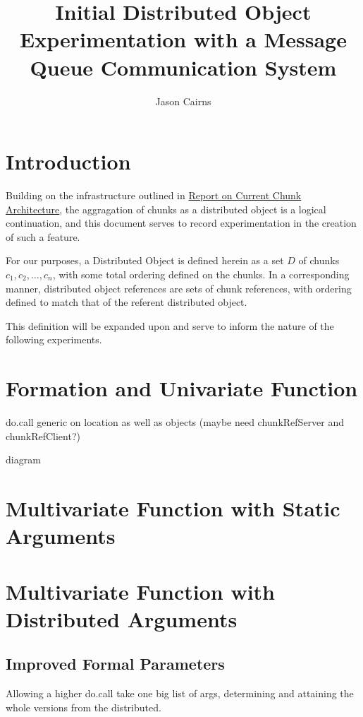 \documentclass[a4paper,10pt]{article}
\begin{document}
\title{Initial Distributed Object Experimentation with a Message Queue Communication System}
\author{Jason Cairns}
  
\maketitle{}

\section{Introduction}

Building on the infrastructure outlined in \href{chunk-report.pdf}{Report on
Current Chunk Architecture}, the aggragation of chunks as a distributed object
is a logical continuation, and this document serves to record experimentation
in the creation of such a feature.

For our purposes, a Distributed Object is defined herein as a set \(D\) of
chunks \(c_1, c_2, \dots, c_n\), with some total ordering defined on the
chunks.  In a corresponding manner, distributed object references are sets of
chunk references, with ordering defined to match that of the referent
distributed object.

This definition will be expanded upon and serve to inform the nature of the
following experiments.

\section{Formation and Univariate Function}

do.call generic on location as well as objects (maybe need chunkRefServer and chunkRefClient?)

diagram

\section{Multivariate Function with Static Arguments}

\section{Multivariate Function with Distributed Arguments}

\subsection{Improved Formal Parameters}

Allowing a higher do.call take one big list of args, determining and attaining
the whole versions from the distributed.
\end{document}
